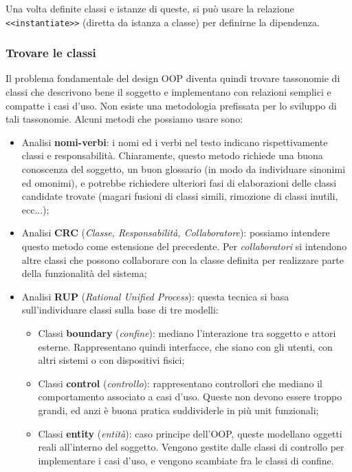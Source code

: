 \documentclass[a4paper,11pt]{article}
\begin{document}
\par\smallskip

Una volta definite classi e istanze di queste, si può usare la relazione \lstinline|<<instantiate>>| (diretta da istanza a classe) per definirne la dipendenza.

\subsubsection{Trovare le classi}
Il problema fondamentale del design OOP diventa quindi trovare tassonomie di classi che descrivono bene il soggetto e implementano con relazioni semplici e compatte i casi d'uso.
Non esiste una metodologia prefissata per lo sviluppo di tali tassonomie. Alcuni metodi che possiamo usare sono:
\begin{itemize}
	\item Analisi \textbf{nomi-verbi}: i nomi ed i verbi nel testo indicano rispettivamente classi e responsabilità. Chiaramente, questo metodo richiede una buona conoscenza del soggetto, un buon glossario (in modo da individuare sinonimi ed omonimi), e potrebbe richiedere ulteriori fasi di elaborazioni delle classi candidate trovate (magari fusioni di classi simili, rimozione di classi inutili, ecc...);
	\item Analisi \textbf{CRC} (\textit{Classe, Responsabilità, Collaboratore}): possiamo intendere questo metodo come estensione del precedente. Per \textit{collaboratori} si intendono altre classi che possono collaborare con la classe definita per realizzare parte della funzionalità del sistema;
	\item Analisi \textbf{RUP} (\textit{Rational Unified Process}): questa tecnica si basa sull'individuare classi sulla base di tre modelli:
		\begin{itemize}
			\item Classi \textbf{boundary} (\textit{confine}): mediano l'interazione tra soggetto e attori esterne. Rappresentano quindi interfacce, che siano con gli utenti, con altri sistemi o con dispositivi fisici;
			\item Classi \textbf{control} (\textit{controllo}): rappresentano controllori che mediano il comportamento associato a casi d'uso. Queste non devono essere troppo grandi, ed anzi è buona pratica suddividerle in più unit funzionali;
			\item Classi \textbf{entity} (\textit{entità}): caso principe dell'OOP, queste modellano oggetti reali all'interno del soggetto. Vengono gestite dalle classi di controllo per implementare i casi d'uso, e vengono scambiate fra le classi di confine.
		\end{itemize}
\end{itemize}
\end{document}
